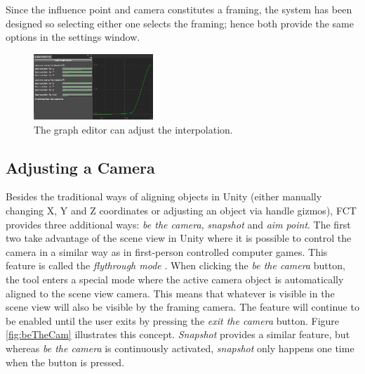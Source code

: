 
Since the influence point and camera constitutes a framing, the system has been designed so selecting either one selects the framing; hence both provide the same options in the settings window.

\begin{figure}[htbp]
\centering
\includegraphics[width=0.4\textwidth]{Pics/curve}
\caption{The graph editor can adjust the interpolation.}
\label{fig:curve}
\end{figure}
\subsection{Adjusting a Camera}

Besides the traditional ways of aligning objects in Unity (either manually changing X, Y and Z coordinates or adjusting an object via handle gizmos), FCT provides three additional ways: \textit{be the camera}, \textit{snapshot} and \textit{aim point}. The first two take advantage of the scene view in Unity where it is possible to control the camera in a similar way as in first-person controlled computer games. This feature is called the \textit{flythrough mode} \cite{unity_flyMode}. When clicking the \textit{be the camera} button, the tool enters a special mode where the active camera object is automatically aligned to the scene view camera. This means that whatever is visible in the scene view will also be visible by the framing camera. The feature will continue to be enabled until the user exits by pressing the \textit{exit the camera} button. Figure \ref{fig:beTheCam} illustrates this concept. \textit{Snapshot} provides a similar feature, but whereas \textit{be the camera} is continuously activated, \textit{snapshot} only happens one time when the button is pressed.

